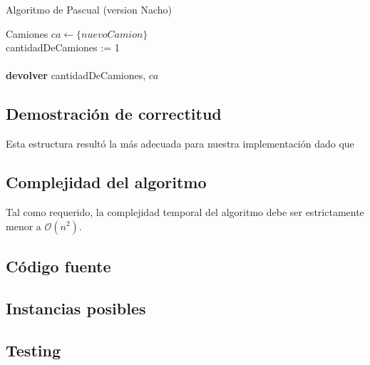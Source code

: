 \begin{algorithm}[H]
	\SetAlgoLined
	\caption{Algoritmo de Pascual (version Nacho)}

	Camiones $ca \leftarrow \{nuevoCamion\}$\\
	cantidadDeCamiones := 1\\
	\\
	\textbf{devolver} cantidadDeCamiones, $ca$


\end{algorithm}

\subsection{Demostración de correctitud}
Esta estructura resultó la más adecuada para nuestra implementación dado que 



\subsection{Complejidad del algoritmo}
Tal como requerido, la complejidad temporal del algoritmo debe ser estrictamente menor a $\mathcal{O}(n^2)$.


\subsection{Código fuente}



\subsection{Instancias posibles}



\subsection{Testing}
